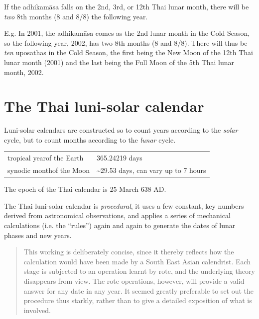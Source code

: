 \documentclass[11pt,oneside]{memoir-article}
\begin{document}
If the adhikamāsa falls on the 2nd, 3rd, or 12th Thai lunar month,
there will be \emph{two} 8th months (8 and 8/8) the following year.

E.g. In 2001, the adhikamāsa comes as the 2nd lunar month in the
Cold Season, so the following year, 2002, has two 8th months (8 and
8/8). There will thus be \emph{ten} uposathas in the Cold Season, the
first being the New Moon of the 12th Thai lunar month (2001) and the
last being the Full Moon of the 5th Thai lunar month, 2002.

\clearpage
\chapter{The Thai luni-solar calendar}
\label{sec-3}

Luni-solar calendars are constructed so to count years according to
the \emph{solar} cycle, but to count months according to the \emph{lunar} cycle.

\begin{center}
\begin{tabular}{ll}
tropical year\footnotemark\space of the Earth & 365.24219 days\\
synodic month\footnotemark\space of the Moon & \textasciitilde{}29.53 days, can vary up to 7 hours\\
\end{tabular}
\end{center}

The epoch of the Thai calendar is 25 March 638 AD.

The Thai luni-solar calendar is \emph{procedural}, it uses a few constant,
key numbers derived from astronomical observations, and applies a
series of mechanical calculations (i.e. the ``rules'') again and again
to generate the dates of lunar phases and new years.

\begin{quote}
This working is deliberately concise, since it thereby reflects how
the calculation would have been made by a South East Asian calendrist.
Each stage is subjected to an operation learnt by rote, and the
underlying theory disappears from view. The rote operations, however,
will provide a valid answer for any date in any year. It seemed
greatly preferable to set out the procedure thus starkly, rather than
to give a detailed exposition of what is involved.\cite{eade-interpolation}
\end{quote}
\end{document}
